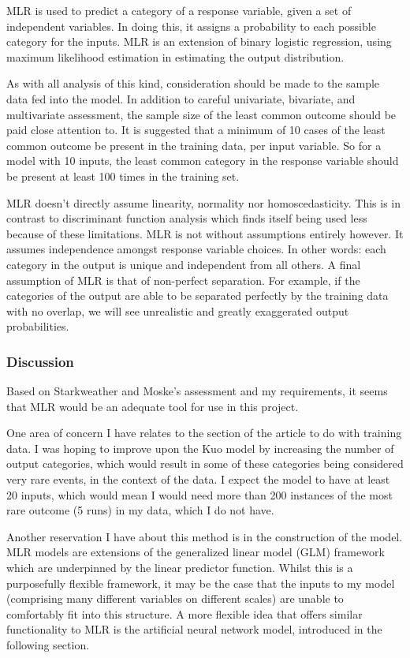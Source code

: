 MLR is used to predict a category of a response variable, given a set of independent variables. In doing this, it assigns a probability to each possible category for the inputs. MLR is an extension of binary logistic regression, using maximum likelihood estimation in estimating the output distribution.

As with all analysis of this kind, consideration should be made to the sample data fed into the model. In addition to careful univariate, bivariate, and multivariate assessment, the sample size of the least common outcome should be paid close attention to. It is suggested that a minimum of 10 cases of the least common outcome be present in the training data, per input variable. So for a model with 10 inputs, the least common category in the response variable should be present at least 100 times in the training set.

MLR doesn’t directly assume linearity, normality nor homoscedasticity. This is in contrast to discriminant function analysis which finds itself being used less because of these limitations. MLR is not without assumptions entirely however. It assumes independence amongst response variable choices. In other words: each category in the output is unique and independent from all others. A final assumption of MLR is that of non-perfect separation. For example, if the categories of the output are able to be separated perfectly by the training data with no overlap, we will see unrealistic and greatly exaggerated output probabilities.

\subsubsection{Discussion}

Based on Starkweather and Moske's assessment and my requirements, it seems that MLR would be an adequate tool for use in this project.

One area of concern I have relates to the section of the article to do with training data. I was hoping to improve upon the Kuo model by increasing the number of output categories, which would result in some of these categories being considered very rare events, in the context of the data. I expect the model to have at least 20 inputs, which would mean I would need more than 200 instances of the most rare outcome (5 runs) in my data, which I do not have.

Another reservation I have about this method is in the construction of the model. MLR models are extensions of the generalized linear model (GLM) framework which are underpinned by the linear predictor function. Whilst this is a purposefully flexible framework, it may be the case that the inputs to my model (comprising many different variables on different scales) are unable to comfortably fit into this structure. A more flexible idea that offers similar functionality to MLR is the artificial neural network model, introduced in the following section.

